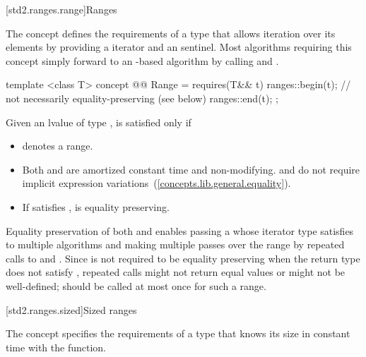[std2.ranges.range]{Ranges}

\pnum
The  concept defines the requirements of a type that allows
iteration over its elements by providing a  iterator and an
 sentinel.
\enternote Most algorithms requiring this concept simply forward to an
-based algorithm by calling  and . \exitnote

\begin{itemdecl}
template <class T>
concept @@ Range =
  requires(T&& t) {
    ranges::begin(t); // not necessarily equality-preserving (see below)
    ranges::end(t);
  };
\end{itemdecl}

\begin{itemdescr}

\pnum
Given an lvalue  of type ,  is satisfied
only if

\begin{itemize}
\item {} denotes a range.

\item Both  and  are amortized constant time
and non-modifying. \enternote {} and  do not require
implicit expression variations~(\ref{concepts.lib.general.equality}). \exitnote

\item If  satisfies ,
 is equality preserving.
\end{itemize}
\end{itemdescr}

\pnum \enternote
Equality preservation of both  and  enables passing a 
whose iterator type satisfies 
to multiple algorithms and
making multiple passes over the range by repeated calls to  and .
Since  is not required to be equality preserving when the return type does
not satisfy , repeated calls might not return equal values or
might not be well-defined;  should be called at most once for such a range.
\exitnote

[std2.ranges.sized]{Sized ranges}

\pnum
The  concept specifies the requirements
of a  type that knows its size in constant time with the
 function.

